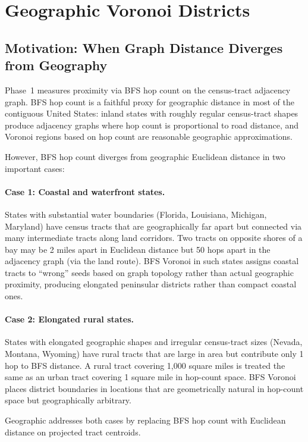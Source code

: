 \section{Geographic Voronoi Districts}
\label{sec:phase2}

\subsection{Motivation: When Graph Distance Diverges from Geography}

Phase~1 \cvd{} measures proximity via BFS hop count on the census-tract
adjacency graph.
BFS hop count is a faithful proxy for geographic distance in most of the
contiguous United States: inland states with roughly regular census-tract
shapes produce adjacency graphs where hop count is proportional to road
distance, and Voronoi regions based on hop count are reasonable geographic
approximations.

However, BFS hop count diverges from geographic Euclidean distance in two
important cases:

\paragraph{Case 1: Coastal and waterfront states.}
States with substantial water boundaries (Florida, Louisiana, Michigan,
Maryland) have census tracts that are geographically far apart but connected
via many intermediate tracts along land corridors.
Two tracts on opposite shores of a bay may be 2 miles apart in Euclidean
distance but 50 hops apart in the adjacency graph (via the land route).
BFS Voronoi in such states assigns coastal tracts to ``wrong'' seeds based
on graph topology rather than actual geographic proximity, producing
elongated peninsular districts rather than compact coastal ones.

\paragraph{Case 2: Elongated rural states.}
States with elongated geographic shapes and irregular census-tract sizes
(Nevada, Montana, Wyoming) have rural tracts that are large in area but
contribute only 1 hop to BFS distance.
A rural tract covering 1{,}000 square miles is treated the same as an urban
tract covering 1 square mile in hop-count space.
BFS Voronoi places district boundaries in locations that are geometrically
natural in hop-count space but geographically arbitrary.

Geographic \cvd{} addresses both cases by replacing BFS hop count with
Euclidean distance on projected tract centroids.

